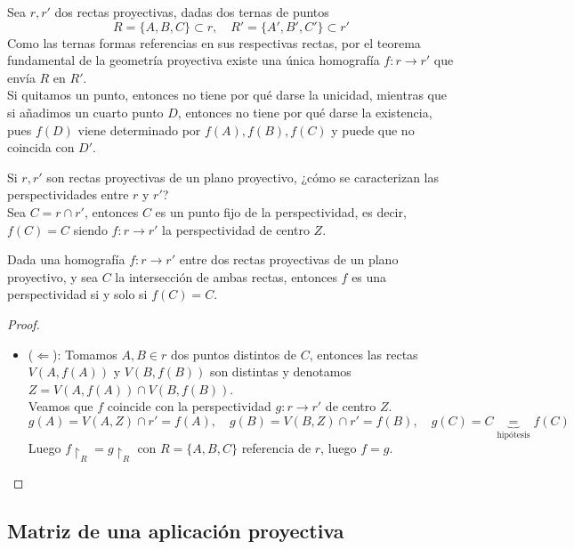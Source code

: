 \begin{observación}
    Sea $r,r'$ dos rectas proyectivas, dadas dos ternas de puntos
    \[
        R = \{A,B,C\} \subset r, \quad R' = \{A',B',C'\} \subset r'
    \]
    Como las ternas formas referencias en sus respectivas rectas, por el teorema fundamental de la geometría proyectiva existe una única homografía $f:r \to r'$ que envía $R$ en $R'$.\\
    Si quitamos un punto, entonces no tiene por qué darse la unicidad, mientras que si añadimos un cuarto punto $D$, entonces no tiene por qué darse la existencia, pues $f(D)$ viene determinado por $f(A),f(B),f(C)$ y puede que no coincida con $D'$.
\end{observación}

Si $r,r'$ son rectas proyectivas de un plano proyectivo, ¿cómo se caracterizan las perspectividades entre $r$ y $r'$?\\
Sea $C = r \cap r'$, entonces $C$ es un punto fijo de la perspectividad, es decir, $f(C) = C$ siendo $f:r \to r'$ la perspectividad de centro $Z$.\\

\begin{proposición}
    Dada una homografía $f:r \to r'$ entre dos rectas proyectivas de un plano proyectivo, y sea $C$ la intersección de ambas rectas, entonces $f$ es una perspectividad si y solo si $f(C) = C$.
\end{proposición}

\begin{proof}
    \leavevmode
    \begin{itemize}
        \item ($\Leftarrow$): Tomamos $A,B \in r$ dos puntos distintos de $C$, entonces las rectas $V(A,f(A))$ y $V(B,f(B))$ son distintas y denotamos $Z = V(A,f(A)) \cap V(B,f(B))$.\\
        Veamos que $f$ coincide con la perspectividad $g:r \to r'$ de centro $Z$.
        \[
            g(A) = V(A,Z) \cap r' = f(A), \quad g(B) = V(B,Z) \cap r' = f(B), \quad g(C) = C \underbrace{=}_{\text{hipótesis}} f(C)            
        \]
        Luego $f \restriction_R = g \restriction_R$ con $R = \{A,B,C\}$ referencia de $r$, luego $f = g$.
    \end{itemize}
\end{proof}


\subsection{Matriz de una aplicación proyectiva}

